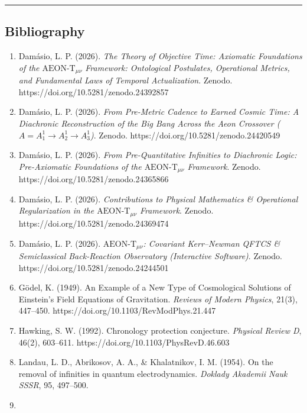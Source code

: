 \documentclass[
]{article}
\providecommand{\tightlist}{%
  \setlength{\itemsep}{0pt}\setlength{\parskip}{0pt}}
\begin{document}
\begin{center}\rule{0.5\linewidth}{0.5pt}\end{center}

\subsection{Bibliography}\label{bibliography}

\begin{enumerate}
\def\labelenumi{\arabic{enumi}.}
\tightlist
\item
  Damásio, L. P. (2026). \emph{The Theory of Objective Time: Axiomatic
  Foundations of the \(\text{AEON-T}_{\mu\nu}\) Framework: Ontological
  Postulates, Operational Metrics, and Fundamental Laws of Temporal
  Actualization}. Zenodo. https://doi.org/10.5281/zenodo.24392857
\item
  Damásio, L. P. (2026). \emph{From Pre-Metric Cadence to Earned Cosmic
  Time: A Diachronic Reconstruction of the Big Bang Across the Aeon
  Crossover (\(A = A_1^1 \to A_2^1 \to A_3^1\))}. Zenodo.
  https://doi.org/10.5281/zenodo.24420549
\item
  Damásio, L. P. (2026). \emph{From Pre-Quantitative Infinities to
  Diachronic Logic: Pre-Axiomatic Foundations of the
  \(\text{AEON-T}_{\mu\nu}\) Framework}. Zenodo.
  https://doi.org/10.5281/zenodo.24365866
\item
  Damásio, L. P. (2026). \emph{Contributions to Physical Mathematics \&
  Operational Regularization in the \(\text{AEON-T}_{\mu\nu}\)
  Framework}. Zenodo. https://doi.org/10.5281/zenodo.24369474
\item
  Damásio, L. P. (2026). \emph{\(\text{AEON-T}_{\mu\nu}\): Covariant
  Kerr--Newman QFTCS \& Semiclassical Back-Reaction Observatory
  (Interactive Software)}. Zenodo.
  https://doi.org/10.5281/zenodo.24244501
\item
  Gödel, K. (1949). An Example of a New Type of Cosmological Solutions
  of Einstein's Field Equations of Gravitation. \emph{Reviews of Modern
  Physics}, 21(3), 447--450. https://doi.org/10.1103/RevModPhys.21.447
\item
  Hawking, S. W. (1992). Chronology protection conjecture.
  \emph{Physical Review D}, 46(2), 603--611.
  https://doi.org/10.1103/PhysRevD.46.603
\item
  Landau, L. D., Abrikosov, A. A., \& Khalatnikov, I. M. (1954). On the
  removal of infinities in quantum electrodynamics. \emph{Doklady
  Akademii Nauk SSSR}, 95, 497--500.
\item

\end{enumerate}
\end{document}
